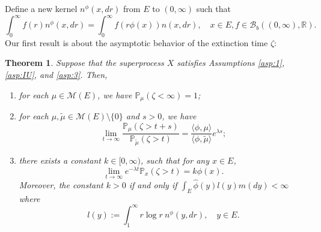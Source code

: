 \documentclass[12pt,a4paper]{amsart}
\numberwithin{equation}{section}
\theoremstyle{plain}
\newtheorem{thm}{Theorem}[section]
\theoremstyle{definition}
\begin{document}
\par
Define a new kernel $n^\phi(x, dr)$ from $E$ to $(0,\infty)$ such that
\begin{equation} \label{eq:phi_change}
	\int_0^\infty f(r)n^\phi(x,dr)=\int_0^\infty f(r\phi(x))n(x, dr),
	\quad x\in E, f\in \mathcal B_b((0,\infty), \mathbb R).
\end{equation}
Our first result is about the asymptotic behavior of the extinction time $\zeta$:

\begin{thm}\label{thm:distribution_of_zeta}
	Suppose that the superprocess $X$ satisfies Assumptions \ref{asp:1},
  \ref{asp:IU}, and \ref{asp:3}. Then,
  \begin{enumerate}
  \item
    \label{subthm:extinct_almost_sure}
    for each $\mu \in \mathcal M(E)$, we have  $\mathbb P_\mu(\zeta<\infty)=1$;
  \item
    for each $\mu,\widetilde\mu\in \mathcal M(E)\setminus\{0\}$ and $s>0$, we have
    \[
      \lim_{t\rightarrow\infty}\dfrac{\mathbb P_{\mu}(\zeta>t+s)}{\mathbb P_{\widetilde\mu}(\zeta>t)}=\frac{\langle \phi,\mu\rangle }{\langle \phi,\widetilde\mu\rangle }e^{\lambda s};
    \]
  \item
  \label{subthm:LlogL}
    there exists a constant $k\in [0,\infty)$, such that for any $x\in E$,
    \begin{equation}\label{eq:decay_rate}
      \lim_{t\rightarrow\infty} e^{-\lambda t}\mathbb P_x(\zeta>t)=k\phi(x).
    \end{equation}
    Moreover, the constant $k>0$ if and only if $\int_E \widehat\phi(y)l(y)m(dy)<\infty$ where
    \begin{equation}\label{eq:m}
      l(y):=\int_1^\infty r\log r~n^\phi(y, dr),\quad y \in E.
    \end{equation}
  \end{enumerate}
\end{thm}
\end{document}
